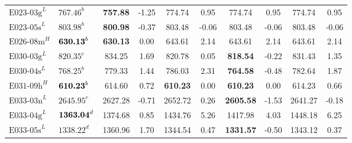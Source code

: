 \begin{table}[ht]
\begin{tabular}{@{}llcccccccc@{}}
        $\text{E023-03g}^L$ & $\text{767.46}^b$           & \textbf{757.88}                  & -1.25                      & 774.74                      & 0.95                       & 774.74           & 0.95         & 774.74          & 0.95         \\
        $\text{E023-05s}^L$ & $\text{803.98}^b$           & \textbf{800.98}                  & -0.37                      & 803.48                      & -0.06                      & 803.48           & -0.06        & 803.48          & -0.06        \\
        $\text{E026-08m}^H$ & $\text{\textbf{630.13}}^b$  & \textbf{630.13}                  & 0.00                       & 643.61                      & 2.14                       & 643.61           & 2.14         & 643.61          & 2.14         \\
        $\text{E030-03g}^L$ & $\text{820.35}^c$           & 834.25                           & 1.69                       & 820.78                      & 0.05                       & \textbf{818.54}  & -0.22        & 831.43          & 1.35         \\
        $\text{E030-04s}^L$ & $\text{768.25}^b$           & 779.33                           & 1.44                       & 786.03                      & 2.31                       & \textbf{764.58}  & -0.48        & 782.64          & 1.87         \\
        $\text{E031-09h}^H$ & $\text{\textbf{610.23}}^b$  & 614.60                           & 0.72                       & \textbf{610.23}             & 0.00                       & \textbf{610.23}  & 0.00         & 614.23          & 0.66         \\
        $\text{E033-03n}^L$ & $\text{2645.95}^c$          & 2627.28                          & -0.71                      & 2652.72                     & 0.26                       & \textbf{2605.58} & -1.53        & 2641.27         & -0.18        \\
        $\text{E033-04g}^L$ & $\text{\textbf{1363.04}}^d$ & 1374.68                          & 0.85                       & 1434.76                     & 5.26                       & 1417.98          & 4.03         & 1448.18         & 6.25         \\
        $\text{E033-05s}^L$ & $\text{1338.22}^d$          & 1360.96                          & 1.70                       & 1344.54                     & 0.47                       & \textbf{1331.57} & -0.50        & 1343.12         & 0.37         \\

\end{tabular}
\end{table}
